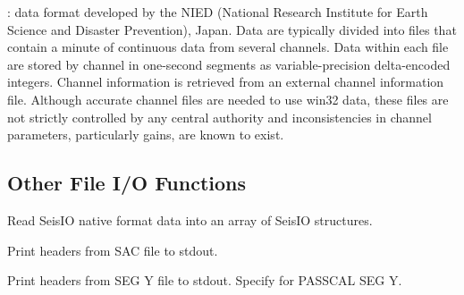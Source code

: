 \documentclass[letterpaper,11pt,english]{sphinxmanual}
\begin{document}
: data format developed
by the NIED (National Research Institute for Earth Science and Disaster Prevention),
Japan.  Data are typically divided into files that contain a minute of continuous
data from several channels. Data within each file are stored by channel in
one-second segments as variable-precision delta-encoded integers. Channel
information is retrieved from an external channel information file. Although
accurate channel files are needed to use win32 data, these files are not strictly
controlled by any central authority and inconsistencies in channel parameters,
particularly gains, are known to exist.


\subsection{Other File I/O Functions}
\label{\detokenize{src/Formats/fileformats:other-file-i-o-functions}}

\begin{fulllineitems}
\label{\detokenize{src/Formats/fileformats:rseis}}
\end{fulllineitems}


Read SeisIO native format data into an array of SeisIO structures.

\begin{fulllineitems}
\label{\detokenize{src/Formats/fileformats:sachdr}}
\end{fulllineitems}


Print headers from SAC file to stdout.

\begin{fulllineitems}
\label{\detokenize{src/Formats/fileformats:segyhdr}}
\end{fulllineitems}


Print headers from SEG Y file to stdout. Specify  for PASSCAL SEG Y.
\end{document}
